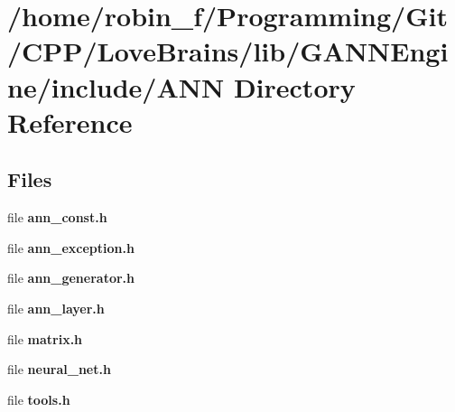 \section{/home/robin\+\_\+f/\+Programming/\+Git/\+C\+P\+P/\+Love\+Brains/lib/\+G\+A\+N\+N\+Engine/include/\+A\+N\+N Directory Reference}
\label{dir_15e0666a1566a06050f2d7312be6acc1}
\subsection*{Files}
\begin{DoxyCompactItemize}
\item 
file {\bfseries ann\+\_\+const.\+h}
\item 
file {\bfseries ann\+\_\+exception.\+h}
\item 
file {\bfseries ann\+\_\+generator.\+h}
\item 
file {\bfseries ann\+\_\+layer.\+h}
\item 
file {\bfseries matrix.\+h}
\item 
file {\bfseries neural\+\_\+net.\+h}
\item 
file {\bfseries tools.\+h}
\end{DoxyCompactItemize}
